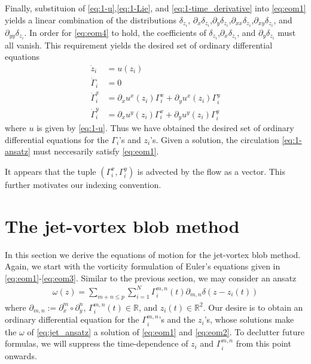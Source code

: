 \documentclass[12pt]{amsart}
\begin{document}
Finally, substituion of \eqref{eq:1-u},\eqref{eq:1-Lie}, and \eqref{eq:1-time_derivative} into \eqref{eq:eom1} yields
a linear combination of the distributions
$\delta_{z_i}$, $\partial_x\delta_{z_i}$,$\partial_y \delta_{z_i}$,$\partial_{xx} \delta_{z_i}$,$\partial_{xy} \delta_{z_i}$, and $\partial_{yy} \delta_{z_i}$.
In order for \eqref{eq:eom4} to hold, the coefficients of $\delta_{z_i}$,$\partial_x \delta_{z_i}$, and $\partial_y \delta_{z_i}$ must all vanish.
This requirement yields the desired set of ordinary differential equations
\begin{align*}
  \dot{z}_i &= u(z_i) \\
  \dot{\Gamma}_i &= 0 \\
  \dot{\Gamma}^x_i  &= \partial_x u^x(z_i) \Gamma^x_i + \partial_y u^x(z_i) \Gamma_i^y \\
  \dot{\Gamma}^y_i  &= \partial_x u^y(z_i) \Gamma^x_i + \partial_y u^y(z_i) \Gamma_i^y 
\end{align*}
where $u$ is given by \eqref{eq:1-u}.
Thus we have obtained the desired set of ordinary differential equations for the $\Gamma_i$'s and $z_i$'s.
Given a solution, the circulation \eqref{eq:1-ansatz} must neccesarily satisfy \eqref{eq:eom1}.

  It appears that the tuple $(\Gamma_i^x,\Gamma_i^y)$ is advected by the flow as a vector.  This further motivates our indexing convention.



\section{The jet-vortex blob method}
\label{sec:jet_vortex_blob}
In this section we derive the equations of motion for the
jet-vortex blob method.
Again, we start with the vorticity formulation of Euler's equations 
given in \eqref{eq:eom1}-\eqref{eq:eom3}.
Similar to the previous section, we may consider an ansatz
\begin{align}
  \omega(z) = \sum_{m+n \leq p} \sum_{i=1}^N \Gamma_i^{m,n}(t) \partial_{m,n} \delta(z-z_i(t))
  \label{eq:jet_ansatz}
\end{align}
where $\partial_{m,n} := \partial_x^m \circ \partial_y^n$,
$\Gamma_i^{m,n}(t) \in \mathbb{R}$,
and $z_i(t) \in \mathbb{R}^2$.
Our desire is to obtain an ordinary differential equation for the $\Gamma^{m,n}_i$'s and the $z_i$'s,
whose solutions make the $\omega$ of \eqref{eq:jet_ansatz} a solution of \eqref{eq:eom1} and \eqref{eq:eom2}.
To declutter future formulas,
we will suppress the time-dependence of $z_i$ and $\Gamma^{m,n}_i$
from this point onwards.
\end{document}
